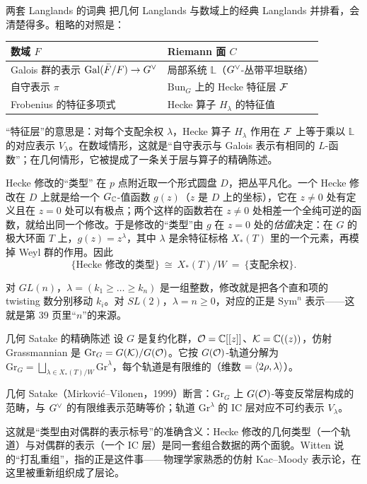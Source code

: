 \begin{pizhu}{两套 Langlands 的词典}
把几何 Langlands 与数域上的经典 Langlands 并排看，会清楚得多。粗略的对照是：

\begin{center}\small
\begin{tabular}{@{}ll@{}}
\toprule
数域 $F$ & Riemann 面 $C$ \\
\midrule
Galois 群的表示 $\mathrm{Gal}(\bar F/F)\to G^{\vee}$ & 局部系统 $\mathbb{L}$（$G^{\vee}$-丛带平坦联络） \\
自守表示 $\pi$ & $\mathrm{Bun}_G$ 上的 Hecke 特征层 $\mathcal{F}$ \\
Frobenius 的特征多项式 & Hecke 算子 $H_\lambda$ 的特征值 \\
\bottomrule
\end{tabular}
\end{center}

“特征层”的意思是：对每个支配余权 $\lambda$，Hecke 算子 $H_\lambda$ 作用在 $\mathcal{F}$ 上等于乘以 $\mathbb{L}$ 的对应表示 $V_\lambda$。在数域情形，这就是“自守表示与 Galois 表示有相同的 $L$-函数”；在几何情形，它被提成了一条关于层与算子的精确陈述。
\end{pizhu}

\begin{pizhu}{Hecke 修改的“类型”}
在 $p$ 点附近取一个形式圆盘 $D$，把丛平凡化。一个 Hecke 修改在 $D$ 上就是给一个 $G_{\mathbb{C}}$-值函数 $g(z)$（$z$ 是 $D$ 上的坐标），它在 $z\ne0$ 处有定义且在 $z=0$ 处可以有极点；两个这样的函数若在 $z\ne0$ 处相差一个全纯可逆的函数，就给出同一个修改。于是修改的“类型”由 $g$ 在 $z=0$ 处的\emph{估值}决定：在 $G$ 的极大环面 $T$ 上，$g(z)=z^{\lambda}$，其中 $\lambda$ 是余特征标格 $X_*(T)$ 里的一个元素，再模掉 Weyl 群的作用。因此
\[
  \{\text{Hecke 修改的类型}\}\ \cong\ X_*(T)/W\ =\ \{\text{支配余权}\}.
\]

对 $GL(n)$，$\lambda=(k_1\ge\dots\ge k_n)$ 是一组整数，修改就是把各个直和项的 twisting 数分别移动 $k_i$。对 $SL(2)$，$\lambda=n\ge0$，对应的正是 $\mathrm{Sym}^n$ 表示——这就是第 39 页里“$n$”的来源。
\end{pizhu}

\begin{pizhu}{几何 Satake 的精确陈述}
设 $G$ 是复约化群，$\mathcal{O}=\mathbb{C}[[z]]$、$\mathcal{K}=\mathbb{C}((z))$，仿射 Grassmannian 是 $\mathrm{Gr}_G=G(\mathcal{K})/G(\mathcal{O})$。它按 $G(\mathcal{O})$-轨道分解为 $\mathrm{Gr}_G=\bigsqcup_{\lambda\in X_*(T)/W}\mathrm{Gr}^\lambda$，每个轨道是有限维的（维数 $=\langle 2\rho,\lambda\rangle$）。

几何 Satake（Mirković--Vilonen，1999）断言：$\mathrm{Gr}_G$ 上 $G(\mathcal{O})$-等变反常层构成的范畴，与 $G^{\vee}$ 的有限维表示范畴等价；轨道 $\mathrm{Gr}^\lambda$ 的 IC 层对应不可约表示 $V_\lambda$。

这就是“类型由对偶群的表示标号”的准确含义：Hecke 修改的几何类型（一个轨道）与对偶群的表示（一个 IC 层）是同一套组合数据的两个面貌。Witten 说的“打乱重组”，指的正是这件事——物理学家熟悉的仿射 Kac--Moody 表示论，在这里被重新组织成了层论。
\end{pizhu}
